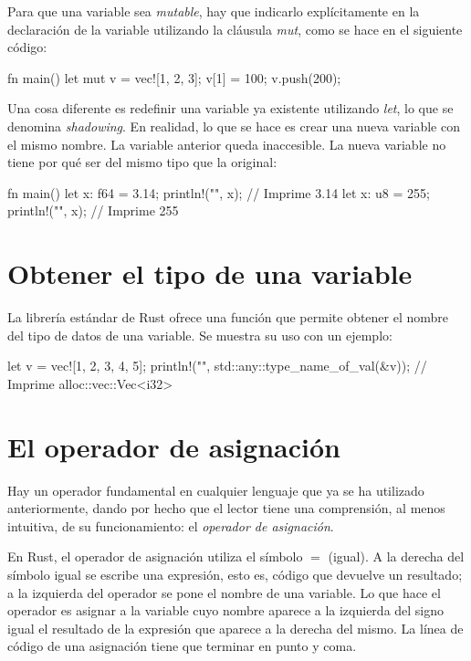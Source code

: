 Para que una variable sea \textit{mutable}, hay que indicarlo explícitamente en la declaración de la variable utilizando la cláusula \textit{mut}, como se hace en el siguiente código:

\vspace{0.7em}
\begin{Codigo}
fn main() {
   let mut v = vec![1, 2, 3];
   v[1] = 100;
   v.push(200);
}
\end{Codigo}

\vspace{1em}

Una cosa diferente es redefinir una variable ya existente utilizando \textit{let}, lo que se denomina \textit{shadowing}. En realidad, lo que se hace es crear una nueva variable con el mismo nombre. La variable anterior queda inaccesible. La nueva variable no tiene por qué ser del mismo tipo que la original:

\vspace{0.7em}
\begin{Codigo}
fn main() {
   let x: f64 = 3.14;
   println!("{}", x); // Imprime 3.14
   let x: u8 = 255;
   println!("{}", x); // Imprime 255
}
\end{Codigo}

\section{Obtener el tipo de una variable}
\noindent La librería estándar de Rust ofrece una función que permite obtener el nombre del tipo de datos de una variable. Se muestra su uso con un ejemplo:

\vspace{0.7em}
\begin{Codigo}
let v = vec![1, 2, 3, 4, 5];
println!("{}", std::any::type_name_of_val(&v)); 
// Imprime alloc::vec::Vec<i32>
\end{Codigo}

\section{El operador de asignación}
\noindent Hay un operador fundamental en cualquier lenguaje que ya se ha utilizado anteriormente, dando por hecho que el lector tiene una comprensión, al menos intuitiva, de su funcionamiento: el \textit{operador de asignación}. 

En Rust, el operador de asignación utiliza el símbolo $=$ (igual). A la derecha del símbolo igual se escribe una expresión, esto es, código que devuelve un resultado; a la izquierda del operador se pone el nombre de una variable. Lo que hace el operador es asignar a la variable cuyo nombre aparece a la izquierda del signo igual el resultado de la expresión que aparece a la derecha del mismo. La línea de código de una asignación tiene que terminar en punto y coma. 

